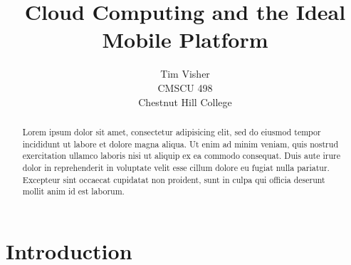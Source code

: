 \documentclass[12pt,oneside,letterpaper,titlepage]{report}
\author{Tim Visher\\ CMSCU 498\\ Chestnut Hill College}
\title{Cloud Computing and the Ideal Mobile Platform}
\begin{document}
\maketitle

\tableofcontents

\newpage

\begin{abstract}

%
%
%
%
%

Lorem ipsum dolor sit amet, consectetur adipisicing elit, sed do eiusmod tempor
incididunt ut labore et dolore magna aliqua. Ut enim ad minim veniam, quis
nostrud exercitation ullamco laboris nisi ut aliquip ex ea commodo
consequat. Duis aute irure dolor in reprehenderit in voluptate velit esse cillum
dolore eu fugiat nulla pariatur. Excepteur sint occaecat cupidatat non proident,
sunt in culpa qui officia deserunt mollit anim id est laborum.

\end{abstract}

\chapter{Introduction}

\newpage
\end{document}

